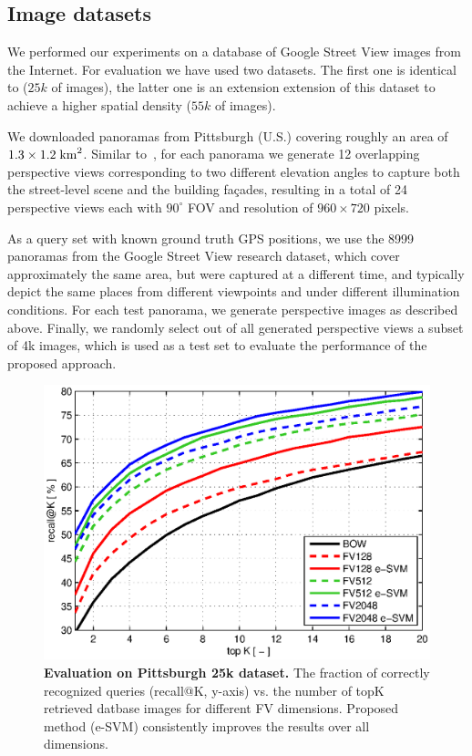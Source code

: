 \documentclass[table]{article} %
\begin{document}
   	\subsection{Image datasets}
		We performed our experiments on a database of Google Street View images from the Internet. For evaluation we have used two datasets. The first one is identical to \cite{Gronat2013, Torii2011} ($25k$ of images), the latter one is an extension extension of this dataset to achieve a higher spatial density ($55k$ of images).

		We downloaded panoramas from Pittsburgh (U.S.) covering roughly an area of $1.3 \times 1.2 \; {\rm km}^2$. Similar to~\cite{Chen11}, for each panorama we generate 12 overlapping perspective views corresponding to two different elevation angles to capture both the street-level scene and the building fa\c{c}ades, resulting in a total of 24 perspective views each with $90^\circ$ FOV and resolution of $960 \times 720$ pixels.

		As a query set with known ground truth GPS positions, we use the 8999 panoramas from the Google Street View research dataset, which cover approximately the same area, but were captured at a different time, and typically depict the same places from different viewpoints and under different illumination conditions. For each test panorama, we generate perspective images as described above. Finally, we randomly select out of all generated perspective views a subset of 4k images, which is used as a test set to evaluate the performance of the proposed approach.



\begin{figure}[t!]
    \centering
    \includegraphics[width=\linewidth]{imgs/plotPitt25k}    
    \caption{
        \textbf{Evaluation on Pittsburgh 25k \cite{Gronat13} dataset.} The fraction of correctly recognized queries (recall@K, y-axis) vs. the number of topK retrieved datbase images for different FV dimensions. Proposed method (e-SVM) consistently improves the results over all dimensions.
    }
    \label{fig:recall}
\end{figure}
\end{document}
